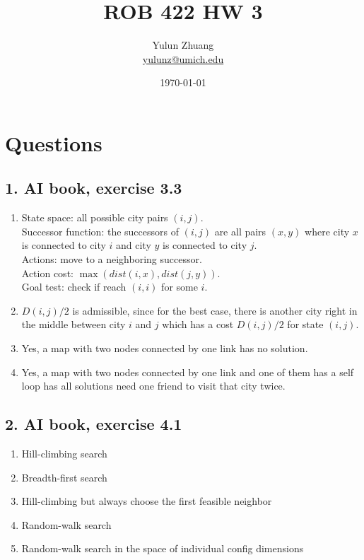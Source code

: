 \documentclass{article}
\title{ROB 422 HW 3}
\author{Yulun Zhuang \\ \href{mailto:yulunz@umich.edu}{yulunz@umich.edu}}
\date{\today}
\theoremstyle{definition} %
\begin{document}
\maketitle

\section*{Questions}
\subsection*{1. AI book, exercise 3.3}
\begin{enumerate}[label=\alph*.]
	\item State space: all possible city pairs $(i, j)$. \\
	Successor function: the successors of $(i, j)$ are all pairs $(x, y)$ where city $x$ is connected to city $i$ and city $y$ is connected to city $j$. \\
	Actions: move to a neighboring successor. \\
	Action cost: $\max(dist(i, x), dist(j, y))$. \\
	Goal test: check if reach $(i, i)$ for some $i$.
	\item $D(i, j) / 2$ is admissible, since for the best case, there is another city right in the middle between city $i$ and $j$ which has a cost $D(i, j) / 2$ for state $(i, j)$.
	\item Yes, a map with two nodes connected by one link has no solution.
	\item Yes, a map with two nodes connected by one link and one of them has a self loop has all solutions need one friend to visit that city twice.
\end{enumerate}

\subsection*{2. AI book, exercise 4.1}
\begin{enumerate}[label=\alph*.]
	\item Hill-climbing search
	\item Breadth-first search
	\item Hill-climbing but always choose the first feasible neighbor
	\item Random-walk search
	\item Random-walk search in the space of individual config dimensions
\end{enumerate}
\end{document}

